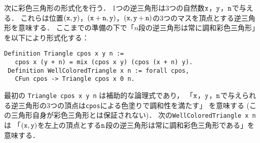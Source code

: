 次に彩色三角形の形式化を行う．
1つの逆三角形は3つの自然数${\tt x}$，${\tt y}$，${\tt n}$で与える．
これらは位置$({\tt x},{\tt y})$，$({\tt x}+{\tt n},{\tt y})$，$({\tt x},{\tt y}+{\tt n})$の3つのマスを頂点とする逆三角形を意味する．
ここまでの準備の下で「$n$段の逆三角形は常に調和彩色三角形」を以下により形式化する：
\begin{lstlisting}[language=Coq]
 Definition Triangle cpos x y n :=
   cpos x (y + n) = mix (cpos x y) (cpos (x + n) y).
 Definition WellColoredTriangle x n := forall cpos,
   CFun cpos -> Triangle cpos x 0 n.
\end{lstlisting}
最初の {\tt Triangle cpos x y n} は補助的な論理式であり，
「${\tt x}$，${\tt y}$，${\tt n}$で与えられる逆三角形の3つの頂点は{\tt cpos}による色塗りで調和性を満たす」
を意味する (この三角形自身が彩色三角形とは保証されない)．
次の{\tt WellColoredTriangle x n} は
「$({\tt x},{\tt y})$を左上の頂点とする${\tt n}$段の逆三角形は常に調和彩色三角形である」を意味する．






